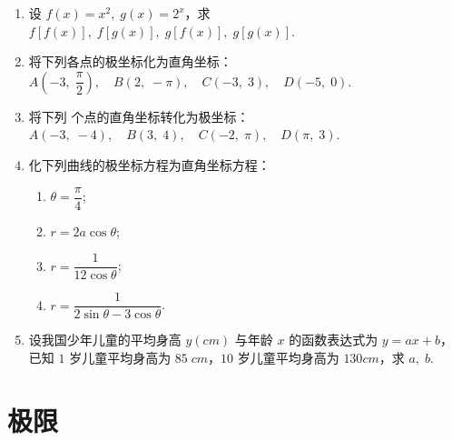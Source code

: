 \begin{enumerate}
    \item 设 $f(x)=x^2,\;g(x)=2^x$，求 $f[f(x)],\;f[g(x)],\;g[f(x)],\;g[g(x)]$.
    
    \item 将下列各点的极坐标化为直角坐标：\\
    $A\left(-3,\;\dfrac{\pi}{2}\right),\quad B(2,\;-\pi),\quad C(-3,\;3),\quad D(-5,\;0)$.

    \item 将下列 个点的直角坐标转化为极坐标：\\
    $A(-3,\;-4),\quad B(3,\;4),\quad C(-2,\;\pi),\quad D(\pi,\;3)$.

    \item 化下列曲线的极坐标方程为直角坐标方程：
    \begin{enumerate}[(1)]\setlength{\itemsep}{5pt}\setlength{\topsep}{15pt}
        \item $\theta=\dfrac{\pi}{4}$;
        \item $r=2a\cos\theta$;
        \item $r=\dfrac{1}{12\cos \theta}$;
        \item $r=\dfrac{1}{2\sin\theta-3\cos\theta}$.
    \end{enumerate}    

    \item 设我国少年儿童的平均身高 $y(cm)$ 与年龄 $x$ 的函数表达式为 $y=ax+b$，已知 $1$ 岁儿童平均身高为 $85\;cm$，$10$ 岁儿童平均身高为 $130cm$，求 $a,\;b$.


\end{enumerate}


\section{极限}

